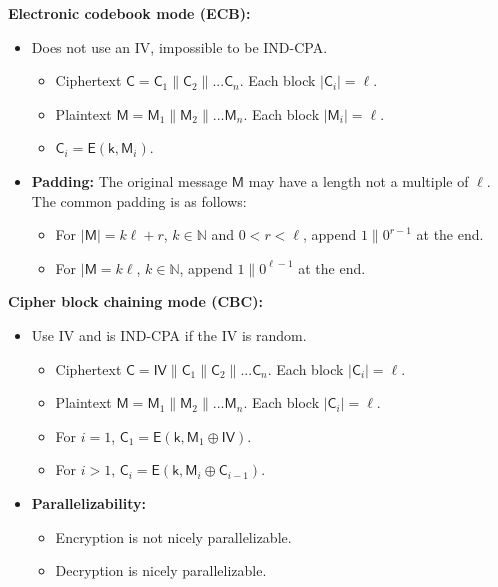\documentclass{article}
\newcommand{\msf}[1]{\mathsf{#1}}
\newcommand{\parhead}[1]{\noindent \textbf{#1}}
\begin{document}
\parhead{Electronic codebook mode (ECB):}
\begin{itemize}
    \item Does not use an IV, impossible to be IND-CPA.
    
    \begin{itemize}
        \item Ciphertext $\msf{C}=\msf{C}_1\parallel\msf{C}_2\parallel...\msf{C}_n$. Each block $|\msf{C}_i|=\ell$.
        
        \item Plaintext $\msf{M}=\msf{M}_1\parallel\msf{M}_2\parallel...\msf{M}_n$. Each block $|\msf{M}_i|=\ell$.
        
        \item $\msf{C}_i=\msf{E}(\msf{k},\msf{M}_i)$.
    \end{itemize}
    
    \item {\bf Padding:} The original message $\msf{M}$ may have a length not a multiple of $\ell$. The common padding is as follows:
    \begin{itemize}
        \item For $|\msf{M}|=k\ell+r$, $k\in\mathbb{N}$ and $0<r<\ell$, append $1\parallel0^{r-1}$ at the end.
        
        \item For $|\msf{M}=k\ell$, $k\in\mathbb{N}$, append $1\parallel 0^{\ell-1}$ at the end.
    \end{itemize}
\end{itemize}

\parhead{Cipher block chaining mode (CBC):}
\begin{itemize}
    \item Use IV and is IND-CPA if the IV is random.
    
    \begin{itemize}
        \item Ciphertext $\msf{C}=\msf{IV}\parallel\msf{C}_1\parallel\msf{C}_2\parallel...\msf{C}_n$. Each block $|\msf{C}_i|=\ell$.
        
        \item Plaintext $\msf{M}=\msf{M}_1\parallel\msf{M}_2\parallel...\msf{M}_n$. Each block $|\msf{C}_i|=\ell$.
        
        \clearpage
        \item For $i=1$, $\msf{C}_1=\msf{E}(\msf{k},\msf{M}_1\oplus\msf{IV})$.
        
        \item For $i>1$, $\msf{C}_i=\msf{E}(\msf{k},\msf{M}_i\oplus \msf{C}_{i-1})$.
    \end{itemize}
    
    \item {\bf Parallelizability:}
    \begin{itemize}
        \item Encryption is not nicely parallelizable.
        
        \item Decryption is nicely parallelizable.
    \end{itemize}
\end{itemize}
\end{document}
